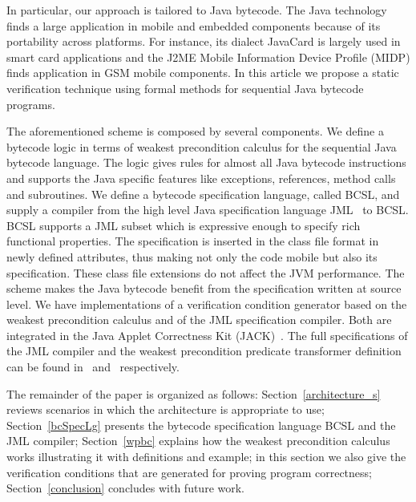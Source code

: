 
In particular, our approach is tailored to Java bytecode.
The Java technology finds a large application in mobile and embedded components because of its portability across platforms. 
For instance, its dialect JavaCard is largely used in smart card applications and the J2ME Mobile Information Device Profile (MIDP) finds application in GSM mobile components. 
In this article we propose a static verification technique using formal methods for sequential Java bytecode programs.

The aforementioned scheme is composed by several components.
We define a bytecode logic in terms of weakest precondition calculus for the sequential Java bytecode language. 
The logic gives rules for almost all Java bytecode instructions and supports the Java specific features like 
exceptions, references, method calls and subroutines.  
 We define a bytecode specification language, called BCSL, and supply a compiler from 
 the high level Java specification language JML~\cite{JMLRefMan} to BCSL. 
 BCSL supports a JML subset which is expressive enough to specify rich functional properties. The specification is 
 inserted in the class file format in newly defined attributes, thus making not only the code mobile but also its specification. These class
 file extensions do not affect the JVM performance. The scheme makes the Java bytecode benefit from the specification written at source level.
 We have implementations of a verification condition generator based on the weakest precondition calculus and of the JML specification compiler. Both are integrated in the Java Applet Correctness Kit (JACK)~\cite{BRL-JACK}. 
 The full specifications of the JML compiler and the weakest precondition predicate transformer definition can be found in~\cite{JML2BCSpec} and~\cite{WPBC} respectively.
  
The remainder of the paper is organized as follows: 
Section~\ref{architecture_s} reviews scenarios in which the architecture is appropriate to use; 
 Section~\ref{bcSpecLg} presents the bytecode 
specification language BCSL and the JML compiler; Section~\ref{wpbc} explains how the weakest precondition calculus works illustrating it with definitions and example; in this section we also give the verification conditions that are generated for 
proving program correctness; %
Section~\ref{conclusion} concludes with future work.  















